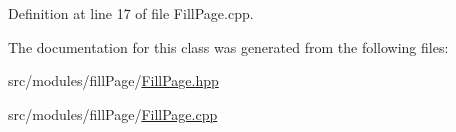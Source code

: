 Definition at line 17 of file Fill\+Page.\+cpp.



The documentation for this class was generated from the following files\+:\begin{DoxyCompactItemize}
\item 
src/modules/fill\+Page/\hyperlink{_fill_page_8hpp}{Fill\+Page.\+hpp}\item 
src/modules/fill\+Page/\hyperlink{_fill_page_8cpp}{Fill\+Page.\+cpp}\end{DoxyCompactItemize}
